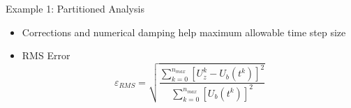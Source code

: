 \documentclass[xcolor=cmyk]{beamer}
\begin{document}
\begin{frame}{Example 1: Partitioned Analysis}
    \begin{itemize}
        \item
        Corrections and numerical damping help maximum allowable time step size
        \item
        RMS Error
        \begin{equation*}
\varepsilon_{RMS}=\sqrt{\frac{\sum_{k=0}^{n_{max}}[U_z^k-U_b(t^k)]^2}{\sum_{k=0}^{n_{max}}[U_b(t^k)]^2}}
\label{RMSdefi}
\end{equation*} 
        
    \end{itemize}
\end{frame}
\end{document}
